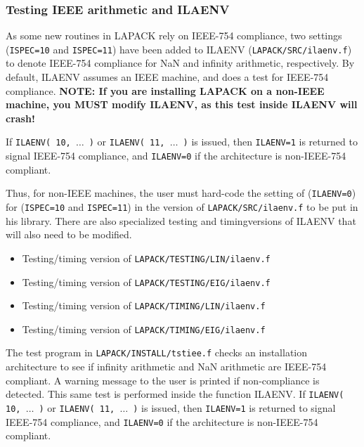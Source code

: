 \documentclass[11pt]{report}
\begin{document}
\subsubsection{Testing IEEE arithmetic and ILAENV}\label{testieee}


As some new routines in LAPACK rely on IEEE-754 compliance,
two settings (\texttt{ISPEC=10} and \texttt{ISPEC=11}) have been added to ILAENV
(\texttt{LAPACK/SRC/ilaenv.f}) to denote IEEE-754 compliance for NaN and
infinity arithmetic, respectively.  By default, ILAENV assumes an IEEE
machine, and does a test for IEEE-754 compliance.  \textbf{NOTE:  If you
are installing LAPACK on a non-IEEE machine, you MUST modify ILAENV,
as this test inside ILAENV will crash!}

If \texttt{ILAENV( 10, $\ldots$ )} or \texttt{ILAENV( 11, $\ldots$ )} is
issued, then \texttt{ILAENV=1} is returned to signal IEEE-754 compliance,
and \texttt{ILAENV=0} if the architecture is non-IEEE-754 compliant.

Thus, for non-IEEE machines, the user must hard-code the setting of
(\texttt{ILAENV=0}) for (\texttt{ISPEC=10} and \texttt{ISPEC=11}) in the version
of \texttt{LAPACK/SRC/ilaenv.f} to be put in
his library.  There are also specialized testing and timing\footnotemark[\value{footnote}] versions of
ILAENV that will also need to be modified.
\begin{itemize}
\item Testing/timing version of \texttt{LAPACK/TESTING/LIN/ilaenv.f}
\item Testing/timing version of \texttt{LAPACK/TESTING/EIG/ilaenv.f}
\item Testing/timing version of \texttt{LAPACK/TIMING/LIN/ilaenv.f}
\item Testing/timing version of \texttt{LAPACK/TIMING/EIG/ilaenv.f}
\end{itemize}


The test program in \texttt{LAPACK/INSTALL/tstiee.f} checks an installation
architecture
to see if infinity arithmetic and NaN arithmetic are IEEE-754 compliant.
A warning message to the user is printed if non-compliance is detected.
This same test is performed inside the function ILAENV.  If
\texttt{ILAENV( 10, $\ldots$ )} or \texttt{ILAENV( 11, $\ldots$ )} is
issued, then \texttt{ILAENV=1} is returned to signal IEEE-754 compliance,
and \texttt{ILAENV=0} if the architecture is non-IEEE-754 compliant.
\end{document}
